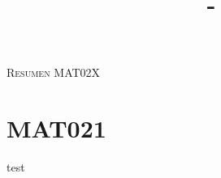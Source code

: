 \documentclass[letterpaper,12pt]{book}
\title{\Titulo - \Sigla \Ramo}
\author{\Name}
\begin{document}
\thispagestyle{empty}

\begin{center}
    \huge{\textsc{Resumen MAT02X}}
\end{center}

\chapter*{MAT021}
    test
\vspace{1em}
\end{document}
